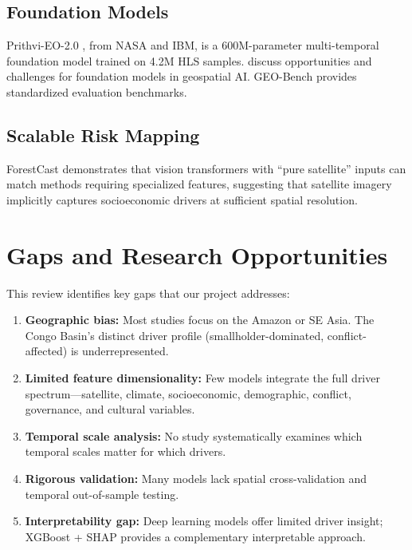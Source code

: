 \documentclass[11pt,a4paper]{article}
\begin{document}
\subsection{Foundation Models}

Prithvi-EO-2.0 \citep{Jakubik2024}, from NASA and IBM, is a 600M-parameter multi-temporal foundation model trained on 4.2M HLS samples. \citet{Mai2023} discuss opportunities and challenges for foundation models in geospatial AI. GEO-Bench \citep{Lacoste2024} provides standardized evaluation benchmarks.

\subsection{Scalable Risk Mapping}

ForestCast \citep{ForestCast2025} demonstrates that vision transformers with ``pure satellite'' inputs can match methods requiring specialized features, suggesting that satellite imagery implicitly captures socioeconomic drivers at sufficient spatial resolution.

\section{Gaps and Research Opportunities}

This review identifies key gaps that our project addresses:

\begin{enumerate}
    \item \textbf{Geographic bias:} Most studies focus on the Amazon or SE Asia. The Congo Basin's distinct driver profile (smallholder-dominated, conflict-affected) is underrepresented.
    \item \textbf{Limited feature dimensionality:} Few models integrate the full driver spectrum---satellite, climate, socioeconomic, demographic, conflict, governance, and cultural variables.
    \item \textbf{Temporal scale analysis:} No study systematically examines which temporal scales matter for which drivers.
    \item \textbf{Rigorous validation:} Many models lack spatial cross-validation and temporal out-of-sample testing.
    \item \textbf{Interpretability gap:} Deep learning models offer limited driver insight; XGBoost + SHAP provides a complementary interpretable approach.
\end{enumerate}


\end{document}
